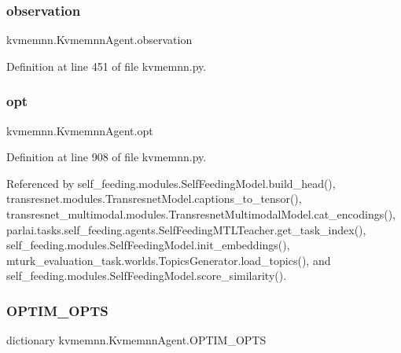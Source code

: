 \subsubsection{\texorpdfstring{observation}{observation}}
{\footnotesize\ttfamily kvmemnn.\+Kvmemnn\+Agent.\+observation}



Definition at line 451 of file kvmemnn.\+py.

\mbox{\label{classkvmemnn_1_1KvmemnnAgent_ab562f6f2d7ad624a9c76c59df5efcb6d}} 
\subsubsection{\texorpdfstring{opt}{opt}}
{\footnotesize\ttfamily kvmemnn.\+Kvmemnn\+Agent.\+opt}



Definition at line 908 of file kvmemnn.\+py.



Referenced by self\+\_\+feeding.\+modules.\+Self\+Feeding\+Model.\+build\+\_\+head(), transresnet.\+modules.\+Transresnet\+Model.\+captions\+\_\+to\+\_\+tensor(), transresnet\+\_\+multimodal.\+modules.\+Transresnet\+Multimodal\+Model.\+cat\+\_\+encodings(), parlai.\+tasks.\+self\+\_\+feeding.\+agents.\+Self\+Feeding\+M\+T\+L\+Teacher.\+get\+\_\+task\+\_\+index(), self\+\_\+feeding.\+modules.\+Self\+Feeding\+Model.\+init\+\_\+embeddings(), mturk\+\_\+evaluation\+\_\+task.\+worlds.\+Topics\+Generator.\+load\+\_\+topics(), and self\+\_\+feeding.\+modules.\+Self\+Feeding\+Model.\+score\+\_\+similarity().

\mbox{\label{classkvmemnn_1_1KvmemnnAgent_a807ca275e7f9ba1135bd35fd92831dff}} 
\subsubsection{\texorpdfstring{O\+P\+T\+I\+M\+\_\+\+O\+P\+TS}{OPTIM\_OPTS}}
{\footnotesize\ttfamily dictionary kvmemnn.\+Kvmemnn\+Agent.\+O\+P\+T\+I\+M\+\_\+\+O\+P\+TS\hspace{0.3cm}{\ttfamily [static]}}

